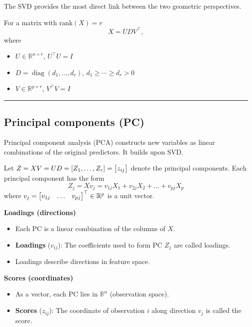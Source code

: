 \documentclass[
  letterpaper,
  DIV=11,
  numbers=noendperiod]{scrreprt}
\providecommand{\tightlist}{%
  \setlength{\itemsep}{0pt}\setlength{\parskip}{0pt}}
\theoremstyle{definition}
\theoremstyle{definition}
\theoremstyle{plain}
\theoremstyle{plain}
\theoremstyle{remark}
\begin{document}
The SVD provides the most direct link between the two geometric
perspectives.

For a matrix with \(\text{rank}(X) = r\) \[
X = U D V^\top,
\] where

\begin{itemize}
\tightlist
\item
  \(U \in \mathbb{R}^{n \times r}\), \(U^\top U = I\)
\item
  \(D = \operatorname{diag}(d_1,\dots,d_r)\),
  \(d_1 \ge \cdots \ge d_r > 0\)
\item
  \(V \in \mathbb{R}^{p \times r}\), \(V^\top V = I\)
\end{itemize}

\begin{center}\rule{0.5\linewidth}{0.5pt}\end{center}

\subsection{Principal components (PC)}\label{principal-components-pc}

Principal component analysis (PCA) constructs new variables as linear
combinations of the original predictors. It builds upon SVD.

Let \(Z =XV=UD= \qty[Z_1, \dots, Z_r]=\mqty[z_{ij}]\) denote the
principal components. Each principal component has the form \[
Z_j = X v_j=v_{1j}X_1+v_{2j}X_2+\ldots+v_{pj}X_p
\] where \(v_j=\mqty[v_{1j}&\ldots&v_{pj}]^{\top} \in \mathbb{R}^p\) is
a unit vector.

\textbf{Loadings (directions)}

\begin{itemize}
\tightlist
\item
  Each PC is a linear combination of the columns of \(X\).
\item
  \textbf{Loadings} (\(v_{ij}\)): The coefficients used to form PC
  \(Z_j\) are called loadings.
\item
  Loadings describe directions in feature space.
\end{itemize}

\textbf{Scores (coordinates)}

\begin{itemize}
\tightlist
\item
  As a vector, each PC lies in \(\mathbb{R}^n\) (observation space).
\item
  \textbf{Scores} (\(z_{ij}\)): The coordinate of observation \(i\)
  along direction \(v_j\) is called the score.
\end{itemize}
\end{document}
